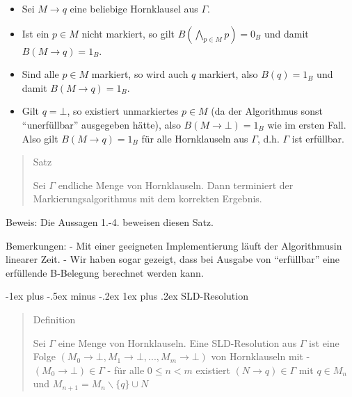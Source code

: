 \documentclass[a4paper]{article}
\makeatletter
\renewcommand{\subsubsection}{\@startsection{subsubsection}{3}{0mm}%
                {-1ex plus -.5ex minus -.2ex}%
                {1ex plus .2ex}%
                {\normalfont\small\bfseries}}
\makeatother
\begin{document}
\begin{multicols}{3}
\begin{enumerate}
          \begin{itemize}
            \item
                  Sei $M\rightarrow q$ eine beliebige Hornklausel aus $\Gamma$.
            \item
                  Ist ein $p\in M$ nicht markiert, so gilt
                  $B(\bigwedge_{p\in M} p) = 0_B$ und damit $B(M\rightarrow q) = 1_B$.
            \item
                  Sind alle $p\in M$ markiert, so wird auch $q$ markiert, also
                  $B(q) = 1_B$ und damit $B(M\rightarrow q) = 1_B$.
            \item
                  Gilt $q=\bot$, so existiert unmarkiertes $p\in M$ (da der
                  Algorithmus sonst ``unerfüllbar'' ausgegeben hätte), also
                  $B(M\rightarrow\bot) = 1_B$ wie im ersten Fall. Also gilt
                  $B(M\rightarrow q) = 1_B$ für alle Hornklauseln aus $\Gamma$, d.h.
                  $\Gamma$ ist erfüllbar.
          \end{itemize}
  \end{enumerate}

  \begin{quote}
    Satz

    Sei $\Gamma$ endliche Menge von Hornklauseln. Dann terminiert der
    Markierungsalgorithmus mit dem korrekten Ergebnis.
  \end{quote}

  Beweis: Die Aussagen 1.-4. beweisen diesen Satz.

  Bemerkungen: - Mit einer geeigneten Implementierung läuft der
  Algorithmusin linearer Zeit. - Wir haben sogar gezeigt, dass bei Ausgabe
  von ``erfüllbar'' eine erfüllende B-Belegung berechnet werden kann.

  \subsubsection{SLD-Resolution}\label{sld-resolution}

  \begin{quote}
    Definition

    Sei $\Gamma$ eine Menge von Hornklauseln. Eine SLD-Resolution aus
    $\Gamma$ ist eine Folge
    $(M_0\rightarrow\bot,M_1\rightarrow\bot,... ,M_m\rightarrow\bot)$ von
    Hornklauseln mit - $(M_0\rightarrow\bot)\in\Gamma$ - für alle
    $0\leq n<m$ existiert $(N\rightarrow q)\in\Gamma$ mit $q\in M_n$ und
    $M_{n+1} = M_n\backslash\{q\}\cup N$
  \end{quote}


\end{multicols}
\end{document}
